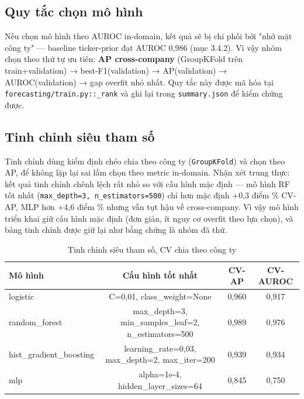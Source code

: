 \documentclass[13pt,a4paper]{extreport}
\begin{document}
\subsection{Quy tắc chọn mô hình}

Nếu chọn mô hình theo AUROC in-domain, kết quả sẽ bị chi phối bởi "nhớ mặt công ty" — baseline ticker-prior đạt AUROC 0,986 (mục 3.4.2). Vì vậy nhóm chọn theo thứ tự ưu tiên: \textbf{AP cross-company} (GroupKFold trên train+validation) → best-F1(validation) → AP(validation) → AUROC(validation) → gap overfit nhỏ nhất. Quy tắc này được mã hóa tại \texttt{forecasting/train.py::\_rank} và ghi lại trong \texttt{summary.json} để kiểm chứng được.

\subsection{Tinh chỉnh siêu tham số}

Tinh chỉnh dùng kiểm định chéo chia theo công ty (\texttt{GroupKFold}) và chọn theo AP, để không lặp lại sai lầm chọn theo metric in-domain. Nhận xét trung thực: kết quả tinh chỉnh chênh lệch rất nhỏ so với cấu hình mặc định — mô hình RF tốt nhất (\texttt{max\_depth=3, n\_estimators=500}) chỉ hơn mặc định +0,3 điểm \% CV-AP, MLP hơn +4,6 điểm \% nhưng vẫn tụt hậu về cross-company. Vì vậy mô hình triển khai giữ cấu hình mặc định (đơn giản, ít nguy cơ overfit theo lựa chọn), và bảng tinh chỉnh được giữ lại như bằng chứng là nhóm đã thử.

\begin{table}[H]
\centering
\caption{Tinh chỉnh siêu tham số, CV chia theo công ty}
\begin{center}
\small
\begin{tabular}{|l|c|c|c|}
\hline
\textbf{Mô hình} & \textbf{Cấu hình tốt nhất} & \textbf{CV-AP} & \textbf{CV-AUROC} \\ \hline
logistic & C=0,01, class\_weight=None & 0,960 & 0,917 \\ \hline
random\_forest & max\_depth=3, min\_samples\_leaf=2, n\_estimators=500 & 0,989 & 0,976 \\ \hline
hist\_gradient\_boosting & learning\_rate=0,03, max\_depth=2, max\_iter=200 & 0,939 & 0,934 \\ \hline
mlp & alpha=1e-4, hidden\_layer\_sizes=64 & 0,845 & 0,750 \\ \hline
\end{tabular}
\end{center}
\end{table}
\end{document}
